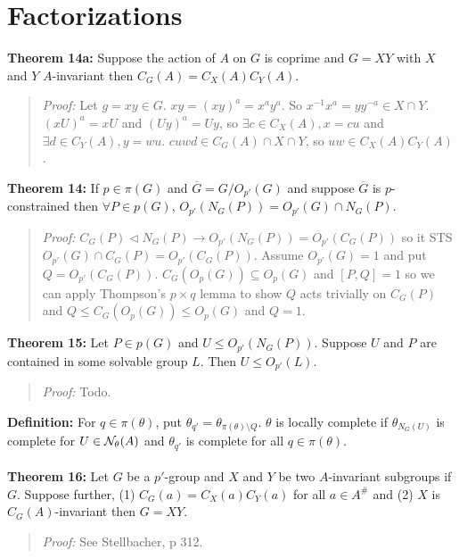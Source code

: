 \section {Factorizations}
{\bf Theorem 14a:}
Suppose the action of $A$ on $G$ is coprime and $G=XY$ with $X$ and $Y$ $A$-invariant then
$C_G(A)= C_X(A) C_Y(A)$.
\begin{quote}
\emph{Proof:} 
Let $g=xy \in G$.  $xy = (xy)^a=x^a y^a$.  So $x^{-1}x^a = yy^{-a} \in X \cap Y$.
$(xU)^a=xU$ and $(Uy)^a=Uy$, so 
$\exists c \in C_X(A), x=cu$ and
$\exists d \in C_Y(A), y=wu$.  $cuwd \in C_G(A) \cap X \cap Y$, so $uw \in C_X(A) C_Y(A)$.
\end{quote}
{\bf Theorem 14:}
If $p \in \pi(G)$ and ${\overline G}= G/ O_{p'}(G)$ and suppose ${\overline G}$ is $p$-constrained
then $\forall P \in p(G)$, $O_{p'}(N_G(P)) = O_{p'}(G) \cap N_G(P)$.
\begin{quote}
\emph{Proof:} 
$C_G(P) \lhd N_G(P) \rightarrow O_{p'}(N_G(P))= O_{p'}(C_G(P))$ so it STS
$O_{p'}(G) \cap C_G(P) = O_{p'}(C_G(P))$.  Assume $O_{p'}(G)=1$ and put $Q=O_{p'}(C_G(P))$.
$C_G(O_p(G)) \subseteq O_p(G)$ and $[P,Q]=1$ so we can apply Thompson's $p \times q$ lemma
to show $Q$ acts trivially on $C_G(P)$ and $Q \leq C_G(O_p(G)) \leq O_p(G)$ and $Q=1$.
\end{quote}
{\bf Theorem 15:}
Let $P \in p(G)$ and $U \leq O_{p'}(N_G(P))$.  Suppose $U$ and $P$ are contained in some solvable group
$L$.  Then $U \leq O_{p'}(L)$.
\begin{quote}
\emph{Proof:} Todo.
\end{quote}
{\bf Definition:} For $q \in \pi(\theta)$, put $\theta_{q'} = \theta_{\pi(\theta) \setminus Q}$.
$\theta$ is locally complete if $\theta_{N_G(U)}$ is complete for $U \in {\cal N}_{\theta}(A)$ and
$\theta_{q'}$ is complete for all $q \in \pi(\theta)$.
\\
\\
{\bf Theorem 16:}
Let $G$ be a $p'$-group and $X$ and $Y$ be two $A$-invariant subgroups if $G$.  Suppose further,
(1) $C_G(a)= C_X(a)C_Y(a)$ for all $a \in A^{\#}$ and (2) $X$ is $C_G(A)$-invariant then $G=XY$.
\begin{quote}
\emph{Proof:} See Stellbacher, p 312.
\end{quote}
